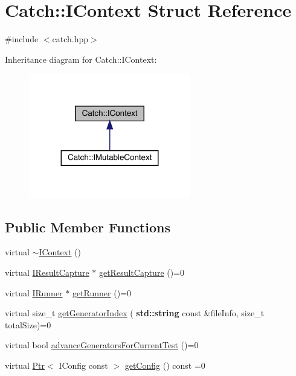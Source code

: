 \hypertarget{struct_catch_1_1_i_context}{}\section{Catch\+:\+:I\+Context Struct Reference}
\label{struct_catch_1_1_i_context}


{\ttfamily \#include $<$catch.\+hpp$>$}



Inheritance diagram for Catch\+:\+:I\+Context\+:
\nopagebreak
\begin{figure}[H]
\begin{center}
\leavevmode
\includegraphics[width=200pt]{struct_catch_1_1_i_context__inherit__graph}
\end{center}
\end{figure}
\subsection*{Public Member Functions}
\begin{DoxyCompactItemize}
\item 
virtual \hyperlink{struct_catch_1_1_i_context_aeb17355c1be6c2ced5407cad7202628d}{$\sim$\+I\+Context} ()
\item 
virtual \hyperlink{struct_catch_1_1_i_result_capture}{I\+Result\+Capture} $\ast$ \hyperlink{struct_catch_1_1_i_context_a684e4ae71d1fdf3060c352ecde1d122f}{get\+Result\+Capture} ()=0
\item 
virtual \hyperlink{struct_catch_1_1_i_runner}{I\+Runner} $\ast$ \hyperlink{struct_catch_1_1_i_context_af088415dde18d039ed5a2f95b02767c6}{get\+Runner} ()=0
\item 
virtual size\+\_\+t \hyperlink{struct_catch_1_1_i_context_a43e07088db43299ba129fbe6d3106e95}{get\+Generator\+Index} (\textbf{ std\+::string} const \&file\+Info, size\+\_\+t total\+Size)=0
\item 
virtual bool \hyperlink{struct_catch_1_1_i_context_a806f7c4ed24d51adae90418e661b24b7}{advance\+Generators\+For\+Current\+Test} ()=0
\item 
virtual \hyperlink{class_catch_1_1_ptr}{Ptr}$<$ I\+Config const  $>$ \hyperlink{struct_catch_1_1_i_context_aee81c415899262e096ad8d6f686fa365}{get\+Config} () const =0
\end{DoxyCompactItemize}


